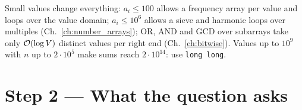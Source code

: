 \begin{insightbox}
Small values change everything: $a_i \le 100$ allows a frequency array per value and loops over the value domain; $a_i \le 10^6$ allows a sieve and harmonic loops over multiples (Ch.~\ref{ch:number_arrays}); OR, AND and GCD over subarrays take only $\mathcal{O}(\log V)$ distinct values per right end (Ch.~\ref{ch:bitwise}). Values up to $10^9$ with $n$ up to $2\cdot10^5$ make sums reach $2\cdot10^{14}$: use \texttt{long long}.
\end{insightbox}

\clearpage
\section*{Step 2 --- What the question asks}

